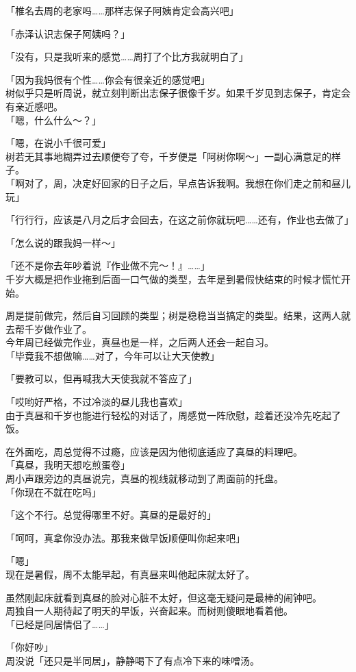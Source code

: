 「椎名去周的老家吗……那样志保子阿姨肯定会高兴吧」

「赤泽认识志保子阿姨吗？」

「没有，只是我听来的感觉……周打了个比方我就明白了」

「因为我妈很有个性……你会有很亲近的感觉吧」\\

树似乎只是听周说，就立刻判断出志保子很像千岁。如果千岁见到志保子，肯定会有亲近感吧。\\

「嗯，什么什么～？」

「嗯，在说小千很可爱」\\

树若无其事地糊弄过去顺便夸了夸，千岁便是「阿树你啊～」一副心满意足的样子。\\

「啊对了，周，决定好回家的日子之后，早点告诉我啊。我想在你们走之前和昼儿玩」

「行行行，应该是八月之后才会回去，在这之前你就玩吧……还有，作业也去做了」

「怎么说的跟我妈一样～」

「还不是你去年吵着说『作业做不完～！』……」\\

千岁大概是把作业拖到后面一口气做的类型，去年是到暑假快结束的时候才慌忙开始。

周是提前做完，然后自习回顾的类型；树是稳稳当当搞定的类型。结果，这两人就去帮千岁做作业了。\\

今年周已经做完作业，真昼也是一样，之后两人还会一起自习。\\

「毕竟我不想做嘛……对了，今年可以让大天使教」

「要教可以，但再喊我大天使我就不答应了」

「哎哟好严格，不过冷淡的昼儿我也喜欢」\\

由于真昼和千岁也能进行轻松的对话了，周感觉一阵欣慰，趁着还没冷先吃起了饭。

在外面吃，周总觉得不过瘾，应该是因为他彻底适应了真昼的料理吧。\\

「真昼，我明天想吃煎蛋卷」\\

周小声跟旁边的真昼说完，真昼的视线就移动到了周面前的托盘。\\

「你现在不就在吃吗」

「这个不行。总觉得哪里不好。真昼的是最好的」

「呵呵，真拿你没办法。那我来做早饭顺便叫你起来吧」

「嗯」\\

现在是暑假，周不太能早起，有真昼来叫他起床就太好了。

虽然刚起床就看到真昼的脸对心脏不太好，但这毫无疑问是最棒的闹钟吧。\\

周独自一人期待起了明天的早饭，兴奋起来。而树则傻眼地看着他。\\

「已经是同居情侣了……」

「你好吵」\\

周没说「还只是半同居」，静静喝下了有点冷下来的味噌汤。
